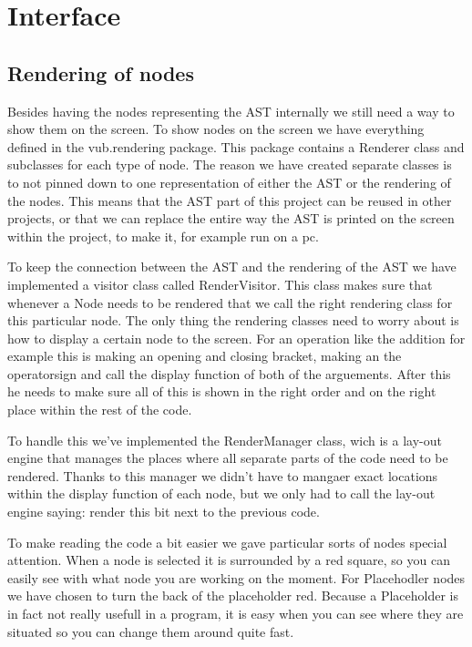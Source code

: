 \documentclass[a4paper,12pt]{report}
\begin{document}
\section{Interface}
\subsection{Rendering of nodes}
Besides having the nodes representing the AST internally we still need a way to show them on the screen. To show nodes on the screen we have everything defined in the vub.rendering package. This package contains a Renderer 
class and subclasses for each type of node. The reason we have created separate classes is to not pinned down to one representation of either the AST or the rendering of the nodes. This means that the AST part of this project
can be reused in other projects, or that we can replace the entire way the AST is printed on the screen within the project, to make it, for example run on a pc.

To keep the connection between the AST and the rendering of the AST we have implemented a visitor class called RenderVisitor. This class makes sure that whenever a Node needs to be rendered that we call the right
rendering class for this particular node. The only thing the rendering classes need to worry about is how to display a certain node to the screen. For an operation like the addition for example this is making an opening and
 closing bracket, making an the operatorsign and call the display function of both of the arguements. After this he needs to make sure all of this is shown in the right order and on the right place within the rest of 
the code. 

To handle this we've implemented the RenderManager class, wich is a lay-out engine that manages the places where all separate parts of the code need to be rendered. Thanks to this manager we didn't have to mangaer 
exact locations within the display function of each node, but we only had to call the lay-out engine saying: render this bit next to the previous code. 

To make reading the code a bit easier we gave particular sorts of nodes special attention. When a node is selected it is surrounded by a red square, so you can easily see with what node you are working on the moment. For Placehodler
nodes we have chosen to turn the back of the placeholder red. Because a Placeholder is in fact not really usefull in a program, it is easy when you can see where they are situated so you can change them around quite fast.
\end{document}
